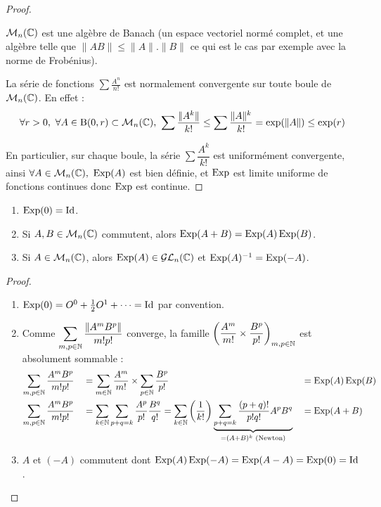 \begin{proof} \
 
$\mathcal{M}_n(\mathbb{C})$ est une algèbre de Banach (un espace vectoriel normé complet, et une
algèbre telle que $\|AB\| \leq \|A\|.\|B\|$ ce qui est le cas par exemple avec
la norme de Frobénius).

La série de fonctions $\sum \frac{A^n}{n!}$ est normalement convergente sur
toute boule de $\mathcal{M}_n(\mathbb{C})$. En effet :
\begin{displaymath}
\forall r > 0,\ \forall A \in \operatorname{B}(0,r)
\subset \mathcal{M}_n(\mathbb{C}),\ \sum \dfrac{|\negthinspace\hspace{0.07em}|A^k|\negthinspace\hspace{0.07em}|}{k!} \leq  \sum\dfrac{|\negthinspace\hspace{0.07em}|A|\negthinspace\hspace{0.07em}|^k}{k!} =
\exp({|\negthinspace\hspace{0.07em}|A|\negthinspace\hspace{0.07em}|}) \leq \exp({r}) 
\end{displaymath}

En particulier, sur chaque boule, la série $\sum \dfrac{A^k}{k!}$ est
uniformément convergente, ainsi $\forall A \in\mathcal{M}_n(\mathbb{C}),\ \operatorname{Exp}(A)$ est bien
définie, et $\operatorname{Exp}$ est limite uniforme de fonctions continues donc $\operatorname{Exp}$ est
continue.
\end{proof} 

\begin{prop}
\begin{enumerate}
 \item $\operatorname{Exp}(0) = \operatorname{Id}$.
 \item Si $A,B\in\mathcal{M}_n(\mathbb{C})$ commutent, alors $\operatorname{Exp}(A+B) = \operatorname{Exp}(A)\operatorname{Exp}(B)$.
 \item Si $A\in\mathcal{M}_n(\mathbb{C})$, alors $\operatorname{Exp}(A) \in\mathcal{GL}_n(\mathbb{C})$ et $\operatorname{Exp}(A)^{-1} =
\operatorname{Exp}(-A)$.
\end{enumerate}
\end{prop}

\begin{proof}\

\begin{enumerate}
 \item $\operatorname{Exp}(0) = O^0 + \frac{1}{2}O^1 + \cdots = \operatorname{Id}$ par convention.
 \item Comme
$\displaystyle\sum_{m,p\in\mathbb{N}}\dfrac{|\negthinspace\hspace{0.07em}|A^mB^p|\negthinspace\hspace{0.07em}|}{m!p!}$ converge, la
famille $\left( \dfrac{A^m}{m!}\times\dfrac{B^p}{p!} \right)_{m,p\in \mathbb{N}}$ est
absolument sommable : \\
\begin{align}
 \sum_{m,p\in\mathbb{N}}\dfrac{A^mB^p}{m!p!} & & &= \sum_{m\in\mathbb{N}}\dfrac{A^m}{m!} \times
\sum_{p\in\mathbb{N}}\dfrac{B^p}{p!} & & = \operatorname{Exp}(A)\operatorname{Exp}(B)\\
 \sum_{m,p\in\mathbb{N}}\dfrac{A^mB^p}{m!p!} & & &=
\sum_{k\in\mathbb{N}} \sum_{p+q=k}\dfrac{A^p}{p!}\dfrac{B^q}{q!}
= \sum_{k\in\mathbb{N}} \left( \dfrac{1}{k!} \right) \underbrace{
\sum_{p+q=k}\dfrac{(p+q)!}{p!q!}A^pB^q}_{=(A+B)^k \text{ (Newton)}}
& &= \operatorname{Exp}(A+B)
\end{align}
\item $A$ et $(-A)$ commutent dont $\operatorname{Exp}(A)\operatorname{Exp}(-A) = \operatorname{Exp}(A-A) = \operatorname{Exp}(0) =
\operatorname{Id}$.
\end{enumerate}

\end{proof}

